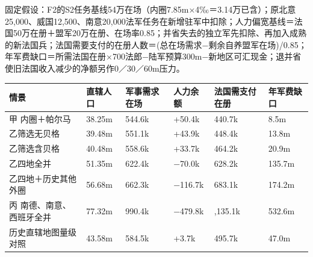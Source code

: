 \documentclass[
  10pt,
  a4paper,
]{article}
\newcounter{none} %
\begin{document}
固定假设：F2的S2任务基线54万在场（内圈7.85m×4‰＝3.14万已含）；原北意25,000、威国12,500、南意20,000法军任务在新增驻军中扣除；人力偏宽基线＝法国50万在册＋盟军20万在册、在场率0.85；并省失去的独立军先扣除、再加入成熟的新法国兵；法国需要支付的在册人数＝(总在场需求−剩余自养盟军在场)/0.85；年军费缺口＝所需法国在册×700法郎−陆军预算300m−新地区可汇现金；退并省使旧法国收入减少的净额另作0／30／60m压力。

{\def\LTcaptype{none} %
\begin{longtable}[]{@{}
  >{\raggedright\arraybackslash}p{}
  >{\raggedleft\arraybackslash}p{}
  >{\raggedleft\arraybackslash}p{}
  >{\raggedleft\arraybackslash}p{}
  >{\raggedleft\arraybackslash}p{}
  >{\raggedleft\arraybackslash}p{}@{}}
\toprule\noalign{}
\begin{minipage}[b]{\linewidth}\raggedright
情景
\end{minipage} & \begin{minipage}[b]{\linewidth}\raggedleft
直辖人口
\end{minipage} & \begin{minipage}[b]{\linewidth}\raggedleft
军事需求在场
\end{minipage} & \begin{minipage}[b]{\linewidth}\raggedleft
人力余额
\end{minipage} & \begin{minipage}[b]{\linewidth}\raggedleft
法国需支付在册
\end{minipage} & \begin{minipage}[b]{\linewidth}\raggedleft
年军费缺口
\end{minipage} \\
\midrule\noalign{}
\endhead
\bottomrule\noalign{}
\endlastfoot
甲 内圈＋帕尔马 & 38.25m & 544.6k & +50.4k & 440.7k & 8.5m \\
乙筛选无贝格 & 39.48m & 551.1k & +43.9k & 448.4k & 13.8m \\
乙筛选含贝格 & 40.48m & 558.6k & +33.7k & 464.2k & 20.9m \\
乙四地全并 & 51.35m & 622.4k & −70.0k & 628.2k & 135.7m \\
乙四地＋历史其他外圈 & 56.68m & 662.3k & −116.7k & 683.1k & 174.2m \\
丙 南德、南意、西班牙全并 & 77.32m & 990.4k & −479.8k & 1,135.1k &
532.6m \\
历史直辖地图量级对照 & 43.58m & 584.5k & +3.7k & 495.7k & 47.0m \\
\end{longtable}
}
\end{document}
